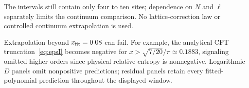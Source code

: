 \begin{table}[p]\centering\scriptsize

\caption{Diagnostics for the Ising $F_3$ fits of
Table~\ref{tab:isingfits}. Signed leading-coefficient errors, RMS relative
residuals, maximum absolute residuals (nats), CV gain, and extrema of the
13 leave-one-size-out leading coefficients follow
Eqs.~\eqref{eq:metrics}--\eqref{eq:cv}. These extrema are sensitivity
measures, not confidence bounds.}
\end{table}
\begin{table}[p]\centering\scriptsize

\caption{The same diagnostics for the boson $F_3$ fits of
Table~\ref{tab:bosonfits}, with exactly the same fitting window and
indicator definitions. Reverse directions are fitted independently.}
\end{table}

The intervals still contain only four to ten sites; dependence on $N$
and $\ell$ separately limits the continuum comparison. No lattice-correction
law or controlled continuum extrapolation is used.

Extrapolation beyond $x_{\rm fit}=0.08$ can fail. For example, the analytical
CFT truncation~\eqref{eq:epsI} becomes negative for
$x>\sqrt{7/20}/\pi\simeq0.1883$, signaling omitted higher orders since
physical relative entropy is nonnegative. Logarithmic $D$ panels omit
nonpositive predictions; residual panels retain every fitted-polynomial
prediction throughout the displayed window.

